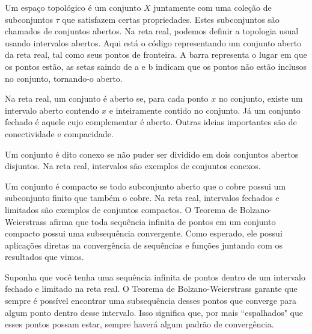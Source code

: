 \documentclass{article}
\begin{document}
Um espaço topológico é um conjunto $X$ juntamente com uma coleção de subconjuntos $\tau$ que satisfazem certas propriedades. Estes subconjuntos são chamados de conjuntos abertos. Na reta real, podemos definir a topologia usual usando intervalos abertos.
Aqui est\'a o c\'odigo representando um conjunto aberto da reta real, tal como seus pontos de fronteira. A barra representa o lugar em que 
os pontos est\~ao, as setas saindo de a e b indicam que os pontos n\~ao est\~ao inclusos no conjunto, tornando-o aberto.

\begin{center}
\end{center}

Na reta real, um conjunto é aberto se, para cada ponto $x$ no conjunto, existe um intervalo aberto contendo $x$ e inteiramente contido no conjunto. Já um conjunto fechado é aquele cujo complementar é aberto.
Outras ideias importantes s\~ao de conectividade e compacidade.

Um conjunto é dito conexo se não puder ser dividido em dois conjuntos abertos disjuntos. Na reta real, intervalos são exemplos de conjuntos conexos.

Um conjunto é compacto se todo subconjunto aberto que o cobre possui um subconjunto finito que também o cobre. Na reta real, intervalos fechados e limitados são exemplos de conjuntos compactos.
O Teorema de Bolzano-Weierstrass afirma que toda sequência infinita de pontos em um conjunto compacto possui uma subsequência convergente. Como esperado,
ele possui aplica\c c\~oes diretas na converg\^encia de sequ\^encias e fun\c c\~oes juntando com os resultados que vimos.

Suponha que você tenha uma sequência infinita de pontos dentro de um intervalo fechado e limitado na reta real. O Teorema de Bolzano-Weierstrass garante que sempre é possível encontrar uma subsequência desses pontos que converge para algum ponto dentro desse intervalo. Isso significa que, por mais ``espalhados" que esses pontos possam estar, sempre haverá algum padrão de convergência.
\end{document}
